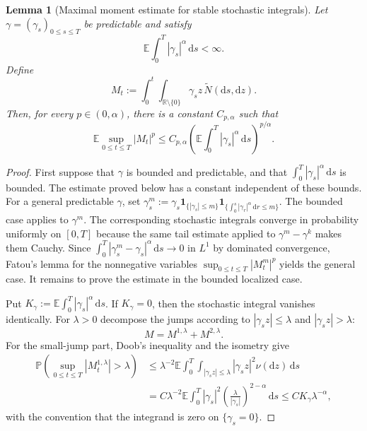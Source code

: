 \documentclass[11pt]{article}
\newtheorem{lemma}[theorem]{Lemma}
\newcommand{\R}{\mathbb{R}}
\newcommand{\E}{\mathbb{E}}
\newcommand{\Pbb}{\mathbb{P}}
\newcommand{\1}{\mathbf{1}}
\newcommand{\dd}{\,\mathrm{d}}
\newcommand{\md}{\mathrm{d}}
\newcommand{\wt}{\tilde}
\begin{document}
\begin{lemma}[Maximal moment estimate for stable stochastic integrals]\label{lem:stable-max}
Let $\gamma=(\gamma_s)_{0\le s\le T}$ be predictable and satisfy
\[
  \E\int_0^T |\gamma_s|^\alpha\dd s<\infty.
\]
Define
\[
  M_t:=\int_0^t\int_{\R\setminus\{0\}}\gamma_s z\,\wt N(\md s,\md z).
\]
Then, for every $p\in(0,\alpha)$, there is a constant $C_{p,\alpha}$ such that
\[
  \E\sup_{0\le t\le T}|M_t|^p
  \le C_{p,\alpha}\left(\E\int_0^T |\gamma_s|^\alpha\dd s\right)^{p/\alpha}.
\]
\end{lemma}


\begin{proof}
First suppose that $\gamma$ is bounded and predictable, and that $\int_0^T|\gamma_s|^\alpha\dd s$ is bounded. The estimate proved below has a constant independent of these bounds. For a general predictable $\gamma$, set $\gamma^{m}_s:=\gamma_s\mathbf 1_{\{|\gamma_s|\le m\}}\mathbf 1_{\{\int_0^s|\gamma_r|^\alpha\dd r\le m\}}$. The bounded case applies to $\gamma^m$. The corresponding stochastic integrals converge in probability uniformly on $[0,T]$ because the same tail estimate applied to $\gamma^m-\gamma^k$ makes them Cauchy. Since $\int_0^T|\gamma_s^m-\gamma_s|^\alpha\dd s\to0$ in $L^1$ by dominated convergence, Fatou's lemma for the nonnegative variables $\sup_{0\le t\le T}|M_t^m|^p$ yields the general case. It remains to prove the estimate in the bounded localized case.

Put $K_\gamma:=\E\int_0^T|\gamma_s|^\alpha\dd s$. If $K_\gamma=0$, then the stochastic integral vanishes identically. For $\lambda>0$ decompose the jumps according to $|\gamma_s z|\le\lambda$ and $|\gamma_s z|>\lambda$:
\[
  M=M^{1,\lambda}+M^{2,\lambda}.
\]
For the small-jump part, Doob's inequality and the isometry give
\begin{align*}
\Pbb\left(\sup_{0\le t\le T}|M_t^{1,\lambda}|>\lambda\right)
&\le \lambda^{-2}\E\int_0^T\int_{|\gamma_s z|\le\lambda}|\gamma_s z|^2\nu(\md z)\dd s\\
&= C \lambda^{-2}\E\int_0^T |\gamma_s|^2\left( \frac{\lambda}{|\gamma_s|}\right)^{2-\alpha}\dd s
\le C K_\gamma\lambda^{-\alpha},
\end{align*}
with the convention that the integrand is zero on $\{\gamma_s=0\}$.


\end{proof}
\end{document}
